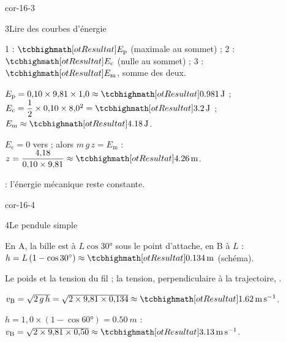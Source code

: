 \begin{blocLivre}{cor-16-3}
\begin{corrige}{3}{Lire des courbes d'énergie}
\begin{questions}
\item 1 : $\res{E_\mathrm{p}}$ (maximale au sommet) ; 2 : $\res{E_\mathrm{c}}$ (nulle au sommet) ; 3 : $\res{E_\mathrm{m}}$, somme des deux.
\item $E_\mathrm{p}=0{,}10\times9{,}81\times1{,}0\approx\res{\qty{0,981}{J}}$ ; $E_\mathrm{c}=\dfrac{1}{2}\times0{,}10\times8{,}0^2=\res{\qty{3,2}{J}}$ ; $E_\mathrm{m}\approx\res{\qty{4,18}{J}}$.
\item $E_\mathrm{c}=0$ vers  ; alors $m\,g\,z=E_\mathrm{m}$ : $z=\dfrac{4{,}18}{0{,}10\times9{,}81}\approx\res{\qty{4,26}{m}}$.
\item {} : l'énergie mécanique reste constante.
\end{questions}
\end{corrige}
\end{blocLivre}
\begin{blocLivre}{cor-16-4}
\begin{corrige}{4}{Le pendule simple}
\begin{questions}
\item En A, la bille est à $L\cos\ang{30}$ sous le point d'attache, en B à $L$ : $h=L\,(1-\cos\ang{30})\approx\res{\qty{0,134}{m}}$ (schéma).
\item Le poids et la tension du fil ; la tension, perpendiculaire à la trajectoire, .
\item $v_\mathrm{B}=\sqrt{2\,g\,h}=\sqrt{2\times9{,}81\times0{,}134}\approx\res{\qty{1,62}{m.s^{-1}}}$.
\item $h=1{,}0\times(1-\cos\ang{60})=\qty{0,50}{m}$ : $v_\mathrm{B}=\sqrt{2\times9{,}81\times0{,}50}\approx\res{\qty{3,13}{m.s^{-1}}}$.
\end{questions}
\end{corrige}
\end{blocLivre}
